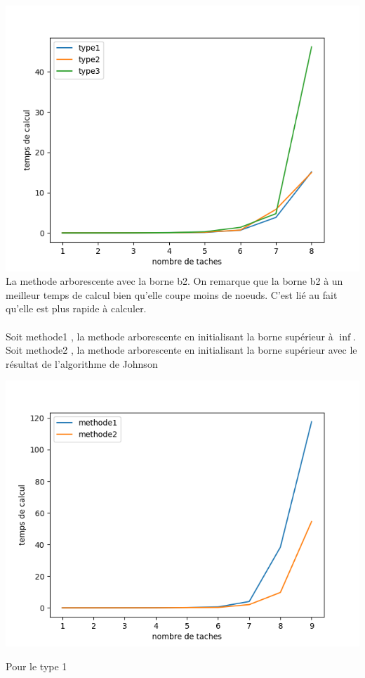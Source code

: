 \documentclass[a4paper, 10pt]{article}
\begin{document}
                \paragraph{}{
                  \includegraphics{graphes/exact_b2.png}
                  La methode arborescente avec la borne b2. On remarque que la borne b2 à un meilleur temps de calcul bien qu'elle coupe moins de noeuds. C'est lié au fait qu'elle est plus rapide à calculer.
                }

                \paragraph{}{
                  Soit methode1 , la methode arborescente en initialisant la borne supérieur à $\inf$.
                  Soit methode2 , la methode arborescente en initialisant la borne supérieur avec le résultat de l'algorithme de Johnson
                  
                  \includegraphics{graphes/exacte_vs_mix_type1.png}
                  }
                Pour le type 1
\end{document}
